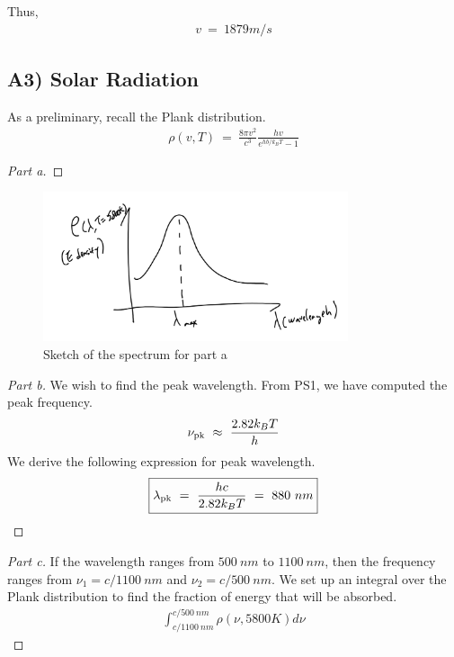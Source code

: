 \documentclass{article}
\numberwithin{equation}{section}
\begin{document}
Thus, 
\begin{align}
    \boxed{
        v \ = \ 1879 m/s
    }
\end{align}

\subsection*{A3) Solar Radiation} 
As a preliminary, recall the Plank distribution. 
\begin{align}
    \rho(v, T) \ = \ \frac {8\pi v^2}{c^3}\frac{hv}{e^{hb/k_BT} - 1}
\end{align}

\begin{proof}
    [Part a]  \phantom{\qedhere}
\end{proof}
    \begin{figure}[h]
        \centering
        \includegraphics[width=0.8\textwidth]{A3_graph.png} %
        \caption{Sketch of the spectrum for part a}
        \label{fig:a3graph}
    \end{figure}
   
\begin{proof}
    [Part b] We wish to find the peak wavelength. From PS1, we have 
    computed the peak frequency. 
    \begin{align}
        \nu_{\rm pk} \ \approx \ \frac {2.82 k_B T} h
    \end{align}
    We derive the following expression for peak wavelength. 
    \begin{align} \boxed{
        \lambda_{\rm pk} \ = \ \frac {hc} {2.82 k_B T} \ = \ 880 \ nm }
    \end{align}
\end{proof}

\begin{proof}
    [Part c] If the wavelength ranges from $500 \ nm$ to $1100 \ nm$, then 
    the frequency ranges from $\nu_1 = c/1100 \ nm$ and $\nu_2 = c/500 \ nm$. 
    We set up an integral over the Plank distribution to find the fraction of energy 
    that will be absorbed. 
    \begin{align}\boxed{
        \int_{c/1100 \ nm}^{c / 500 \ nm } \rho(\nu, 5800K) d\nu}
    \end{align}
\end{proof}
\end{document}
